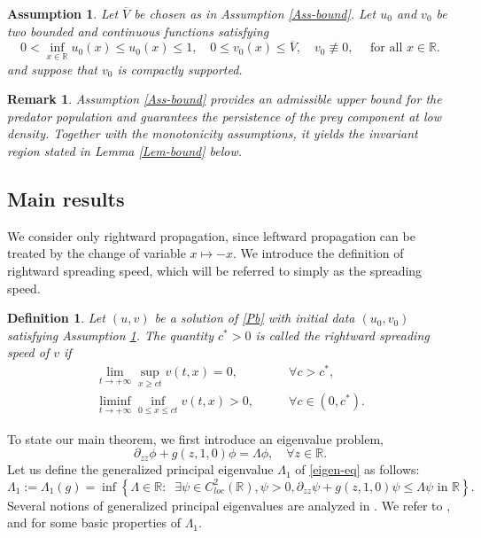 \documentclass[10pt]{article}
\numberwithin{equation}{section}
\newcommand{\R}{\mathbb{R}}
\newtheorem{assumption}[theorem]{Assumption}
\newtheorem{definition}[theorem]{Definition}
\newtheorem{remark}[theorem]{Remark}
\begin{document}
\begin{assumption}\label{Ass-IC}
Let  $\overline{V}$ be chosen  as in Assumption \ref{Ass-bound}.  Let $u_0$ and $v_0$ be two bounded and continuous functions satisfying
$$
0<\inf_{x\in\R} u_0(x)\le u_0(x) \le 1,
\quad
0\le v_0(x)\le \overline{V},\quad
v_0\not\equiv 0,  \quad \text{ for all }   x\in \R. 
$$
and suppose that $v_0$ is compactly supported. 
\end{assumption}

\begin{remark}
\rm 
Assumption \ref{Ass-bound}  provides an admissible upper bound for the predator population and guarantees the persistence of the prey component at low density. Together with the monotonicity assumptions, it yields the invariant region stated in Lemma \ref{Lem-bound}    below.
\end{remark}

\subsection{Main results}
We consider only  rightward propagation, since leftward propagation  can be treated by    the change of  variable  $x\mapsto -x$.  We introduce the definition of rightward spreading speed, which will   be referred to   simply as  the spreading speed.
\begin{definition}\label{Def-speed}
Let $(u, v)$ be a  solution of \eqref{Pb}   with  initial data $(u_0, v_0)$ satisfying Assumption \ref{Ass-IC}. The quantity $c^*>0$ is called the \textit{rightward spreading speed} of $v$ if 
\begin{align*}
\lim_{t\to +\infty} \sup_{x\geq ct} v(t,x) =0,  \qquad & \forall c>c^*, \\
\liminf_{t\to +\infty} \inf_{ 0 \leq x\leq ct} v(t,x)>0,  \qquad & \forall c\in (0, c^*).
\end{align*}
\end{definition}


To state our main theorem, we first introduce an eigenvalue problem, 
\begin{equation}\label{eigen-eq}
\partial_{zz} \phi + g(z, 1,0 ) \phi = \Lambda \phi,  \quad \forall z\in \R.
\end{equation}
Let us define the generalized  principal  eigenvalue $\Lambda_1$ of \eqref{eigen-eq} as follows: 
\begin{equation}\label{ev}
\Lambda_1 := \Lambda_1(g)= \inf\left\{ \Lambda \in \R: \;\;  \exists \psi \in C^2_{loc} (\R), \psi>0,  \partial_{zz} \psi + g(z, 1,0) \psi \leq \Lambda \psi \text{ in } \R  \right\}.
\end{equation}
Several notions of generalized principal eigenvalues are analyzed in \cite{berestyckiRossi2015generalizations}.
We refer  to \cite{berestyckiRossi2015generalizations}, \cite[Proposition 3.1]{GGM2024} and  \cite[Proposition 4.2]{LNY2024} for some basic properties of $\Lambda_1$.
\end{document}
